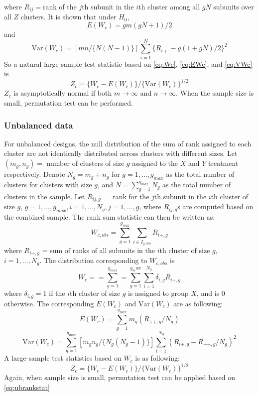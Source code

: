 \documentclass[nojss]{jss}\usepackage[]{graphicx}\usepackage[]{color}
\begin{document}
where $R_{ij}=$rank of the $j$th subunit in the
$i$th cluster among all $gN$ subunits over all $Z$ clusters. It is shown that under $H_0$,
\begin{equation}\label{eq:EWc}
E(W_c) = gm(gN + 1)/2
\end{equation}
and
\begin{equation}\label{eq:VWc}
\text{Var}(W_c) = [mn/\{N(N-1)\}]\sum^N_{i=1}\{R_{i+} - g(1+gN)/2\}^2
\end{equation}
So a natural large sample test statistic based on \eqref{eq:Wc}, \eqref{eq:EWc}, and \eqref{eq:VWc} is
\begin{equation}
Z_c = \{W_c - E(W_c)\}/\{\text{Var}(W_c)\}^{1/2}
\end{equation}
$Z_c$ is asymptotically normal if both $m \to \infty$ and $n \to \infty$.
When the sample size is small, permutation test can be
performed.


\subsubsection{Unbalanced data}\label{ubrank}

For unbalanced designs, the null distribution
of the sum of rank
assigned to each cluster are not
identically distributed across clusters
with different sizes.
Let $(m_g, n_g)=$ number of clusters of
size $g$ assigned to the $X$ and $Y$ treatment
respectively.
Denote $N_g = m_g + n_g$ for $g=1,\ldots,g_{max}$
as the total number of clusters for clusters with
size $g$,
and $N =\sum_{g=1}^{g_{max}}N_g$ as the total number
of clusters in the sample.
Let $R_{ij,g} = $ rank for the $j$th
subunit in the $i$th cluster of size $g$,
$g = 1, \ldots, g_{max},
i = 1, \ldots, N_g, j = 1, \ldots, g$,
where $R_{ij,g}$s are computed based on the
combined sample.
The rank sum statistic can then be
written as:
\begin{equation}
W_{c, obs} = \sum_{g=1}^{g_{max}}
\sum_{i\in I_{g, obs}}R_{i+, g}
\end{equation}
where $R_{i+,g}$ = sum of ranks of
all subunits in the $i$th cluster of size $g$,
$i = 1, \ldots, N_g$.
The distribution corresponding to $W_{c, obs}$
is
\begin{equation}
\label{eq:ubrankstat}
W_c = = \sum_{g = 1}^{g_{max}}
 = \sum_{g = 1}^{g_max}\sum_{i = 1}^{N_g}\delta_{i, g}R_{i+, g}
\end{equation}
where $\delta_{i, g} = 1$ if the $i$th
cluster of size $g$ is assigned to group $X$, and is $0$
otherwise.
The corresponding $E(W_c)$ and $\text{Var}(W_c)$ are
as following:
\begin{equation}\label{eq:uEWc}
E(W_c) = \sum_{g=1}^{g_{max}}m_g(R_{++,g}/N_g)
\end{equation}
\begin{equation}\label{eq:uVWc}
\text{Var}(W_c) = \sum_{g=1}^{g_{max}}[m_gn_g/\{N_g(N_g - 1)\}]\sum_{i=1}^{N_g}(R_{i+,g} - R_{++,g}/N_g)^2
\end{equation}
A large-sample test statistics based on $W_c$ is as following:
\begin{equation}
Z_c = \{W_c - E(W_c)\}/\{\text{Var}(W_c)\}^{1/2}
\end{equation}
Again, when sample size is small, permutation test can
be applied based on \eqref{eq:ubrankstat}
\end{document}
